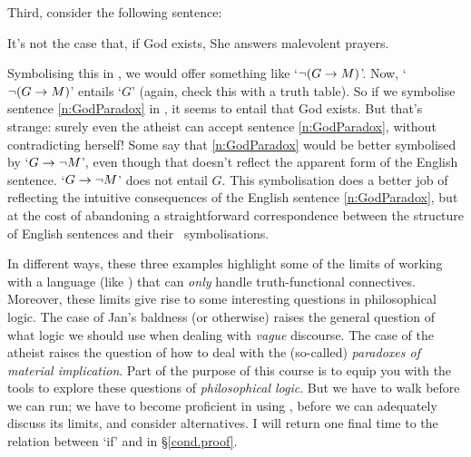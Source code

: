 Third, consider the following sentence:
	\begin{earg}
		\item[\ex{n:GodParadox}]	It's not the case that, if God exists, She answers malevolent prayers.
	\end{earg}
Symbolising this in \TFL, we would offer something like `$\neg (G \rightarrow M)$'. Now, `$\neg (G \rightarrow M)$' entails `$G$' (again, check this with a truth table). So if we symbolise sentence \ref{n:GodParadox} in \TFL, it seems to entail that God exists. But that's strange: surely even the atheist can accept sentence \ref{n:GodParadox}, without contradicting herself! Some say that \ref{n:GodParadox} would be better symbolised by `$G \rightarrow \neg M$', even though that doesn't reflect the apparent form of the English sentence. `$G \rightarrow \neg M$' does not entail $G$. This symbolisation does a better job of reflecting the intuitive consequences of the English sentence \ref{n:GodParadox}, but at the cost of abandoning a straightforward correspondence between the structure of English sentences and their \TFL\ symbolisations. 


In different ways, these three examples highlight some of the limits of working with a language (like \TFL) that can \emph{only} handle truth-functional connectives. Moreover, these limits give rise to some interesting questions in philosophical logic. The case of Jan's baldness (or otherwise) raises the general question of what logic we should use when dealing with \emph{vague} discourse. The case of the atheist raises the question of how to deal with the (so-called) \emph{paradoxes of material implication}. Part of the purpose of this course is to equip you with the tools to explore these questions of \emph{philosophical logic}. But we have to walk before we can run; we have to become proficient in using \TFL, before we can adequately discuss its limits, and consider alternatives. I will return one final time to the relation between `if' and {\eif} in §\ref{cond.proof}.







